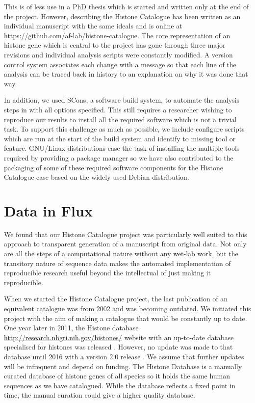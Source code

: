 This is of less use
in a PhD thesis which is started and written only at the end of the
project.
However,
 describing the Histone Catalogue
has been written as an individual
manuscript with the same ideals and is online at
\url{https://github.com/af-lab/histone-catalogue}.  The core
representation of an histone gene
which is central to the project has gone through
three major revisions and individual analysis scripts were constantly
modified.  A version control system associates each change with a
message so that each line of the analysis can be traced back in
history to an explanation on why it was done that way.

In addition, we used SCons, a software build system, to automate the analysis
steps in  with all options specified.
This still requires a researcher wishing to reproduce
our results to install all the required software which is not a
trivial task.  To support this challenge as much as possible, we include
configure scripts which are run at the start of the build system and
identify to missing tool or feature. 
GNU/Linux distributions ease
the task of installing the multiple tools required by providing a
package manager so we have also contributed to the packaging of
some of these required software components
for the Histone Catalogue case based on the
widely used Debian distribution.


\section{Data in Flux}

We found that our Histone Catalogue project was particularly well suited
to this approach to transparent generation of a manuscript from
original data.  Not only are all the steps of a computational
nature without any wet-lab work, but the transitory nature of sequence data
makes the automated implementation of reproducible research useful
beyond the intellectual of just making it reproducible.

When we started the Histone Catalogue project, the last publication of
an equivalent catalogue
was from 2002 and was becoming outdated.  We initiated
this project with the aim of making a catalogue that would be
constantly up to date.  One year later in 2011, the Histone database
\url{http://research.nhgri.nih.gov/histones/}
website with an up-to-date database specialised for histones
was released \citep{histonedb-2011}.
However, no update was made to that database until 2016 with a version 2.0
release \citep{histonedb-2016}.
We assume that further updates will
be infrequent and depend on funding.
The Histone Database is a manually curated database of histone
genes of all species so it holds the same human sequences as we have
catalogued.  While the database reflects a fixed point in time,
the manual curation could give a higher quality database.

